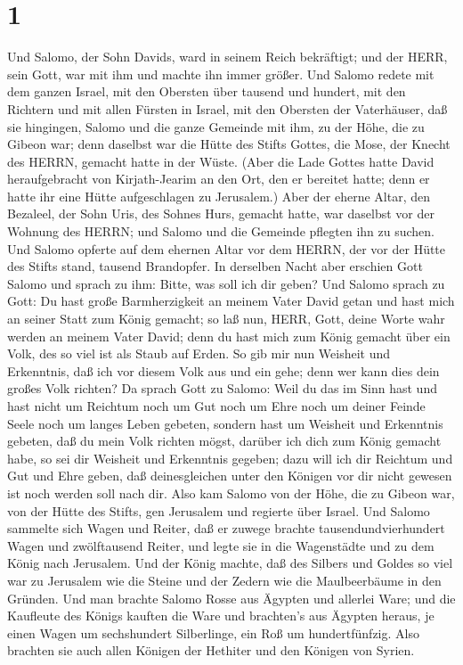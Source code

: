 \hypertarget{section}{%
\section{1}\label{section}}

 Und Salomo, der Sohn Davids, ward in seinem Reich
bekräftigt; und der HERR, sein Gott, war mit ihm und machte ihn immer
größer.  Und Salomo redete mit dem ganzen Israel, mit den
Obersten über tausend und hundert, mit den Richtern und mit allen
Fürsten in Israel, mit den Obersten der Vaterhäuser,  daß
sie hingingen, Salomo und die ganze Gemeinde mit ihm, zu der Höhe, die
zu Gibeon war; denn daselbst war die Hütte des Stifts Gottes, die Mose,
der Knecht des HERRN, gemacht hatte in der Wüste.  (Aber die
Lade Gottes hatte David heraufgebracht von Kirjath-Jearim an den Ort,
den er bereitet hatte; denn er hatte ihr eine Hütte aufgeschlagen zu
Jerusalem.)  Aber der eherne Altar, den Bezaleel, der Sohn
Uris, des Sohnes Hurs, gemacht hatte, war daselbst vor der Wohnung des
HERRN; und Salomo und die Gemeinde pflegten ihn zu suchen. 
Und Salomo opferte auf dem ehernen Altar vor dem HERRN, der vor der
Hütte des Stifts stand, tausend Brandopfer.  In derselben
Nacht aber erschien Gott Salomo und sprach zu ihm: Bitte, was soll ich
dir geben?  Und Salomo sprach zu Gott: Du hast große
Barmherzigkeit an meinem Vater David getan und hast mich an seiner Statt
zum König gemacht;  so laß nun, HERR, Gott, deine Worte wahr
werden an meinem Vater David; denn du hast mich zum König gemacht über
ein Volk, des so viel ist als Staub auf Erden.  So gib mir
nun Weisheit und Erkenntnis, daß ich vor diesem Volk aus und ein gehe;
denn wer kann dies dein großes Volk richten?  Da sprach
Gott zu Salomo: Weil du das im Sinn hast und hast nicht um Reichtum noch
um Gut noch um Ehre noch um deiner Feinde Seele noch um langes Leben
gebeten, sondern hast um Weisheit und Erkenntnis gebeten, daß du mein
Volk richten mögst, darüber ich dich zum König gemacht habe,
 so sei dir Weisheit und Erkenntnis gegeben; dazu will ich
dir Reichtum und Gut und Ehre geben, daß deinesgleichen unter den
Königen vor dir nicht gewesen ist noch werden soll nach dir.
 Also kam Salomo von der Höhe, die zu Gibeon war, von der
Hütte des Stifts, gen Jerusalem und regierte über Israel. 
Und Salomo sammelte sich Wagen und Reiter, daß er zuwege brachte
tausendundvierhundert Wagen und zwölftausend Reiter, und legte sie in
die Wagenstädte und zu dem König nach Jerusalem.  Und der
König machte, daß des Silbers und Goldes so viel war zu Jerusalem wie
die Steine und der Zedern wie die Maulbeerbäume in den Gründen.
 Und man brachte Salomo Rosse aus Ägypten und allerlei
Ware; und die Kaufleute des Königs kauften die Ware  und
brachten's aus Ägypten heraus, je einen Wagen um sechshundert
Silberlinge, ein Roß um hundertfünfzig. Also brachten sie auch allen
Königen der Hethiter und den Königen von Syrien.

